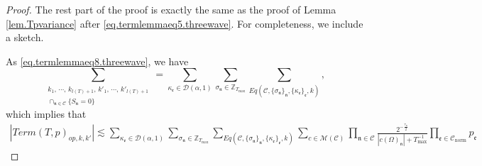 \begin{proof}
The rest part of the proof is exactly the same as the proof of Lemma \ref{lem.Tpvariance} after \eqref{eq.termlemmaeq5.threewave}. For completeness, we include a sketch.

As \eqref{eq.termlemmaeq8.threewave}, we have  
\begin{equation}
    \sum_{\substack{k_1,\, \cdots,\, k_{l(T)+1},\, k'_1,\, \cdots,\, k'_{l(T)+1}\\\cap_{\mathfrak{n}\in \mathcal{C}} \{S_{\mathfrak{n}}=0\}}}=\sum_{\kappa_{\mathfrak{e}}\in \mathcal{D}(\alpha,1)}\sum_{\sigma_{\mathfrak{n}}\in \mathbb{Z}_{T_{\text{max}}}}\sum_{Eq(\mathcal{C}, \{\sigma_{\mathfrak{n}}\}_{\mathfrak{n}}, \{\kappa_{\mathfrak{e}}\}_{\mathfrak{e}},k)},
\end{equation}
which implies that
\begin{equation}\label{eq.termlemmaeq6op.threewave}
\begin{split}
    |Term(T, p)_{op,k,k'}|\lesssim \sum_{\kappa_{\mathfrak{e}}\in \mathcal{D}(\alpha,1)}\sum_{\sigma_{\mathfrak{n}}\in \mathbb{Z}_{T_{\text{max}}}}\sum_{Eq(\mathcal{C}, \{\sigma_{\mathfrak{n}}\}_{\mathfrak{n}}, \{\kappa_{\mathfrak{e}}\}_{\mathfrak{e}},k)} \sum_{c\in \mathscr{M}(\mathcal{C}) }\prod_{\mathfrak{n}\in \mathcal{C}}\frac{2^{-\frac{\tau_{\mathfrak{n}}}{2}}}{|c(\Omega)_{\mathfrak{n}}|+T^{-1}_{\text{max}}} \prod_{\mathfrak{e}\in \mathcal{C}_{\text{norm}}} p_{\mathfrak{e}}
\end{split}
\end{equation}



\end{proof}
